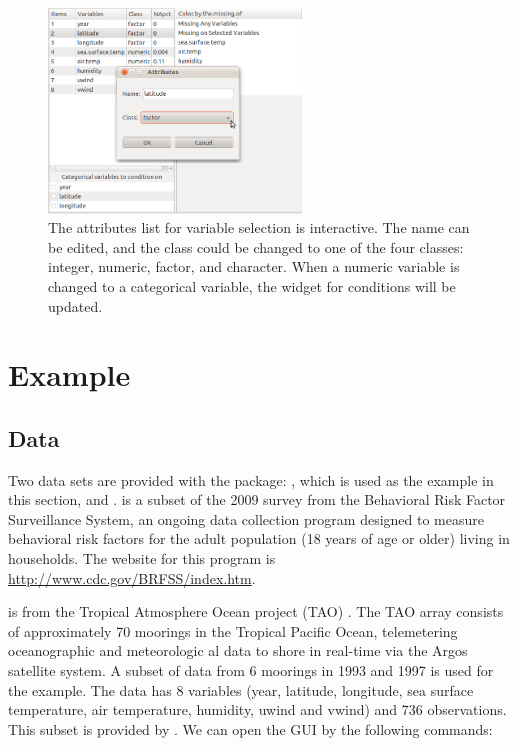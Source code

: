 \documentclass[article]{jss}
\begin{document}
\begin{center}
\begin{figure}[h]
\begin{centering}
\includegraphics[width=0.6\textwidth]{fig9}
\par\end{centering}
\label{fig: attributes}
\caption{The attributes list for variable selection is interactive. The name can be edited, and the class could be changed to one of the four classes: integer, numeric, factor, and character. When a numeric variable is changed to a categorical variable, the widget for conditions will be updated.}
\end{figure}
\par\end{center}


\section{Example}

\subsection{Data}

Two data sets are provided with the package: , which is used as the example in this section, and .  is a subset of the 2009 survey from the Behavioral Risk Factor Surveillance System, an ongoing data collection program designed to measure behavioral risk factors for the adult population (18 years of age or older) living in households. The website for this program is \url{http://www.cdc.gov/BRFSS/index.htm}.

 is from the Tropical Atmosphere Ocean project (TAO) \citep{tao}. The TAO array consists of approximately 70 moorings in the Tropical Pacific Ocean, telemetering oceanographic and meteorologic al data to shore in real-time via the Argos satellite system. A subset of data from 6 moorings in 1993 and 1997 is used for the example. The data has 8 variables (year, latitude, longitude, sea surface temperature, air temperature, humidity, uwind and vwind) and 736 observations. This subset is provided by \citet{CS07}. We can open the GUI by the following commands:
\end{document}
